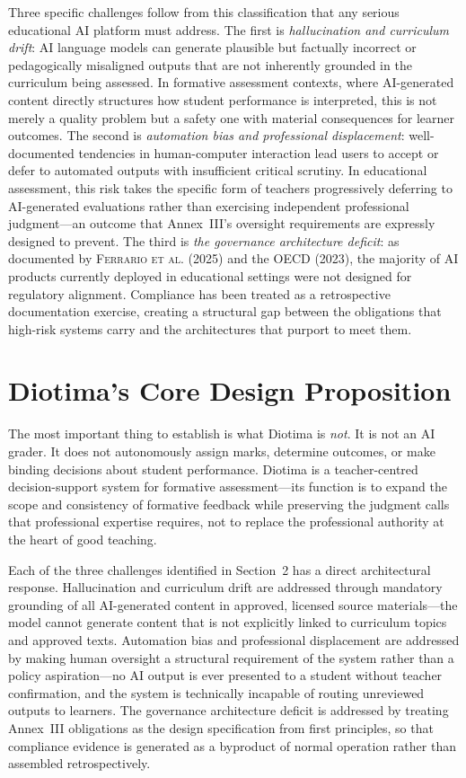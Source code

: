\documentclass[10pt, a4paper, twocolumn]{article}
\begin{document}
Three specific challenges follow from this classification that any serious educational
AI platform must address. The first is \textit{hallucination and curriculum drift}: AI
language models can generate plausible but factually incorrect or pedagogically
misaligned outputs that are not inherently grounded in the curriculum being assessed. In formative
assessment contexts, where AI-generated content directly structures how student
performance is interpreted, this is not merely a quality problem but a safety one with
material consequences for learner outcomes. The second is \textit{automation bias and
professional displacement}: well-documented tendencies in human-computer interaction
lead users to accept or defer to automated outputs with insufficient critical scrutiny.
In educational assessment, this risk takes the specific form of teachers progressively
deferring to AI-generated evaluations rather than exercising independent professional
judgment---an outcome that Annex~III's oversight requirements are expressly designed to
prevent. The third is \textit{the governance architecture deficit}: as documented by
\textsc{Ferrario et al.} (2025) and the \textsc{OECD} (2023), the majority of AI
products currently deployed in educational settings were not designed for regulatory
alignment. Compliance has been treated as a retrospective documentation exercise,
creating a structural gap between the obligations that high-risk systems carry and the
architectures that purport to meet them.

\section{Diotima's Core Design Proposition}

The most important thing to establish is what Diotima is \textit{not}. It is not an
AI grader. It does not autonomously assign marks, determine outcomes, or make binding
decisions about student performance. Diotima is a teacher-centred decision-support
system for formative assessment---its function is to expand the scope and consistency
of formative feedback while preserving the judgment calls that professional expertise
requires, not to replace the professional authority at the heart of good teaching.

Each of the three challenges identified in Section~2 has a direct architectural
response. Hallucination and curriculum drift are addressed through mandatory grounding
of all AI-generated content in approved, licensed source materials---the model cannot
generate content that is not explicitly linked to curriculum topics and approved texts.
Automation bias and professional displacement are addressed by making human oversight a
structural requirement of the system rather than a policy aspiration---no AI output is
ever presented to a student without teacher confirmation, and the system is technically
incapable of routing unreviewed outputs to learners. The governance architecture deficit
is addressed by treating Annex~III obligations as the design specification from first
principles, so that compliance evidence is generated as a byproduct of normal operation
rather than assembled retrospectively.
\end{document}
